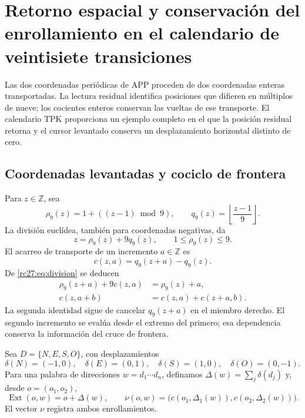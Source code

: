 
\section[Retorno espacial y enrollamiento del cursor]{Retorno espacial y conservación del enrollamiento en el calendario de veintisiete transiciones}
\label{rc27:sec:cursor}

Las dos coordenadas periódicas de APP proceden de dos coordenadas
enteras transportadas. La lectura residual identifica posiciones que
difieren en múltiplos de nueve; los cocientes enteros conservan las
vueltas de ese transporte. El calendario TPK proporciona un ejemplo
completo en el que la posición residual retorna y el cursor levantado
conserva un desplazamiento horizontal distinto de cero.

\subsection{Coordenadas levantadas y cociclo de frontera}

Para $z\in\mathbb Z$, sea
\[
\rho_9(z)=1+((z-1)\bmod9),\qquad
q_9(z)=\left\lfloor\frac{z-1}{9}\right\rfloor.
\]
La división euclídea, también para coordenadas negativas, da
\begin{equation}
z=\rho_9(z)+9q_9(z),\qquad1\le\rho_9(z)\le9.
\label{rc27:eq:division}
\end{equation}
El acarreo de transporte de un incremento $a\in\mathbb Z$ es
\[
c(z,a)=q_9(z+a)-q_9(z).
\]
De \eqref{rc27:eq:division} se deducen
\begin{align}
\rho_9(z+a)+9c(z,a)&=\rho_9(z)+a,\\
c(z,a+b)&=c(z,a)+c(z+a,b).
\label{rc27:eq:cociclo}
\end{align}
La segunda identidad sigue de cancelar $q_9(z+a)$ en el miembro
derecho. El segundo incremento se evalúa desde el extremo del primero;
esa dependencia conserva la información del cruce de frontera.

Sea $D=\{N,E,S,O\}$, con desplazamientos
\[
\delta(N)=(-1,0),\quad\delta(E)=(0,1),\quad
\delta(S)=(1,0),\quad\delta(O)=(0,-1).
\]
Para una palabra de direcciones $w=d_1\cdots d_n$, definamos
$\Delta(w)=\sum_j\delta(d_j)$ y, desde $o=(o_1,o_2)$,
\[
\operatorname{Ext}(o,w)=o+\Delta(w),\qquad
\nu(o,w)=\bigl(c(o_1,\Delta_1(w)),c(o_2,\Delta_2(w))\bigr).
\]
El vector $\nu$ registra ambos enrollamientos.

